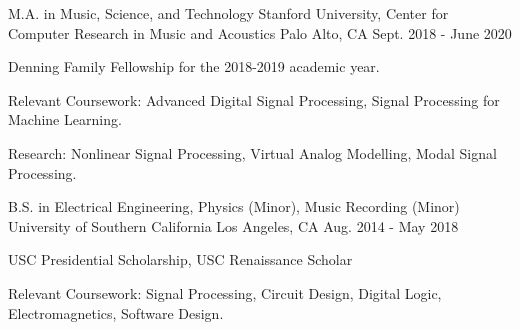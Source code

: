 

\begin{cventries}

    \cventry
    {M.A. in Music, Science, and Technology} %
    {Stanford University, Center for Computer Research in Music and Acoustics} %
    {Palo Alto, CA} %
    {Sept. 2018 - June 2020} %
    {
      \begin{cvitems} %
        \item {Denning Family Fellowship for the 2018-2019 academic year.}
        \item {Relevant Coursework: Advanced Digital Signal Processing, Signal Processing for Machine Learning.}
        \item {Research: Nonlinear Signal Processing, Virtual Analog Modelling, Modal Signal Processing.}
      \end{cvitems}
    }

    \cventry
    {B.S. in Electrical Engineering, Physics (Minor), Music Recording (Minor)} %
    {University of Southern California} %
    {Los Angeles, CA} %
    {Aug. 2014 - May 2018} %
    {
      \begin{cvitems} %
        \item {USC Presidential Scholarship, USC Renaissance Scholar}
        \item {Relevant Coursework: Signal Processing, Circuit Design, Digital Logic, Electromagnetics, Software Design.}
      \end{cvitems}
    }

\end{cventries}
